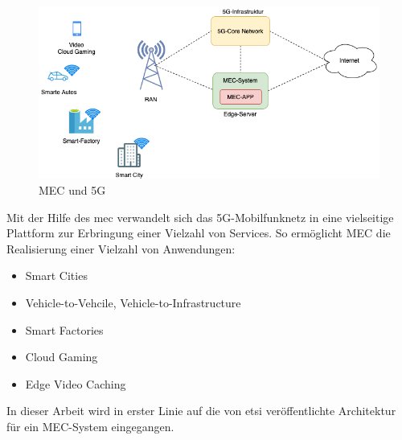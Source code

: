 \documentclass[runningheads]{llncs}
\numberwithin{figure}{section}
\begin{document}
\begin{figure}
  \includegraphics[width=\linewidth]{images/mec-and-5g.png}
  \caption{MEC und 5G}
  \label{fig:mec-and-5g}
\end{figure}
Mit der Hilfe des \acrfull{mec} verwandelt sich das 5G-Mobilfunknetz in eine vielseitige Plattform zur Erbringung 
einer Vielzahl von Services. So ermöglicht MEC die Realisierung einer Vielzahl von Anwendungen: \cite{talebMultiAccessEdgeComputing23}\cite{depellegriniCompetitiveCachingContents2017}\cite{etsiMultiaccessEdgeComputing}
\begin{itemize}
  \item Smart Cities
  \item Vehicle-to-Vehcile, Vehicle-to-Infrastructure
  \item Smart Factories
  \item Cloud Gaming 
  \item Edge Video Caching
\end{itemize}
In dieser Arbeit wird in erster Linie auf die von \acrshort{etsi} veröffentlichte Architektur für ein MEC-System eingegangen.
\newpage
\end{document}
